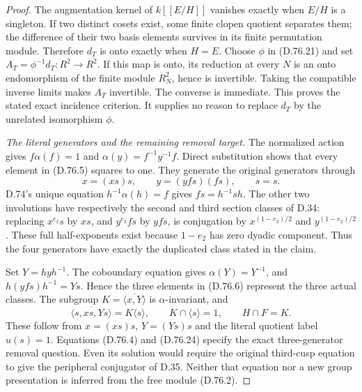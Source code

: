 \begin{proof}
The augmentation kernel of $k[[E/H]]$ vanishes exactly
when $E/H$ is a singleton. If two distinct cosets
exist, some finite clopen quotient separates them;
the difference of their two basis elements survives
in its finite permutation module.
Therefore $d_T$ is onto exactly when $H=E$.
Choose $\phi$ in (D.76.21) and set
$A_T=\phi^{-1}d_T:R^2\to R^2$.
If this map is onto, its reduction at every $N$
is an onto endomorphism of the finite module $R_N^2$,
hence is invertible. Taking the compatible inverse
limits makes $A_T$ invertible. The converse is immediate.
This proves the stated exact incidence criterion.
It supplies no reason to replace $d_T$ by the unrelated
isomorphism $\phi$.

\emph{The literal generators and the remaining removal target.}
The normalized action gives
$f\alpha(f)=1$ and
$\alpha(y)=f^{-1}y^{-1}f$.
Direct substitution shows that every element in
(D.76.5) squares to one.
They generate the original generators through
\[
            x=(xs)s,\qquad y=(yfs)(fs),\qquad s=s.
                                                               \tag{D.76.23}
\]
D.74's unique equation $h^{-1}\alpha(h)=f$ gives
$fs=h^{-1}sh$.
The other two involutions have respectively the
second and third section classes of D.34: replacing
$x^{e_2}s$ by $xs$, and $y^{e_2}fs$ by $yfs$, is
conjugation by $x^{(1-e_2)/2}$ and $y^{(1-e_2)/2}$.
These full half-exponents exist because $1-e_2$
has zero dyadic component.
Thus the four generators have exactly the duplicated
class stated in the claim.

Set $Y=hyh^{-1}$. The coboundary equation gives
$\alpha(Y)=Y^{-1}$, and
$h(yfs)h^{-1}=Ys$.
Hence the three elements in (D.76.6) represent the
three actual classes.
The subgroup $K=\overline{\langle x,Y\rangle}$ is
$\alpha$-invariant, and
\[
       \overline{\langle s,xs,Ys\rangle}
                          =K\langle s\rangle,\qquad
       K\cap\langle s\rangle=1,\qquad
       H\cap F=K.
                                                               \tag{D.76.24}
\]
These follow from $x=(xs)s$, $Y=(Ys)s$ and the
literal quotient label $u(s)=1$.
Equations (D.76.4) and (D.76.24) specify the exact
three-generator removal question.
Even its solution would require the original
third-cusp equation to give the peripheral conjugator
of D.35. Neither that equation nor a new group
presentation is inferred from the free module (D.76.2).
\end{proof}
